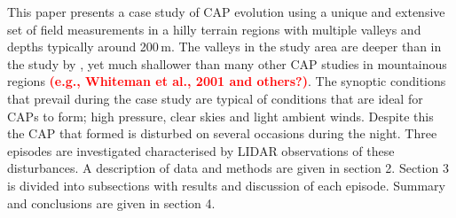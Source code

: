 \documentclass[times]{qjrms4}
\begin{document}
This paper presents a case study of CAP evolution using a unique and extensive set of field measurements in a hilly terrain regions with multiple valleys and depths typically around 200$\,\mbox{m}$. The valleys in the study area are deeper than in the study by \citet{mahrt2015common}, yet much shallower than many other CAP studies in mountainous regions \textcolor{red}{\bf (e.g., Whiteman et al., 2001 and others?)}. The synoptic conditions that prevail during the case study are typical of conditions that are ideal for CAPs to form; high pressure, clear skies and light ambient winds. Despite this the CAP that formed is disturbed on several occasions during the night. Three episodes are investigated characterised by LIDAR observations of these disturbances. A description of data and methods are given in section 2. Section 3 is divided into subsections with results and discussion of each episode. Summary and conclusions are given in section 4.
\end{document}
